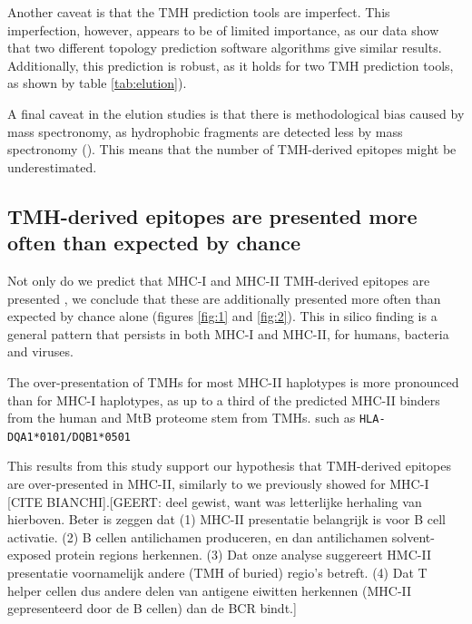 Another caveat is that the TMH prediction tools are imperfect.
This imperfection, however, appears to be of limited importance,
as our data show that two different topology prediction software algorithms give similar results.
Additionally, this 
prediction is robust, as it holds for two TMH prediction tools, 
as shown by table \ref{tab:elution}).

A final caveat in the elution studies is that there is methodological bias caused by mass spectronomy,
as hydrophobic fragments are detected less 
by mass spectronomy (\cite{bianchi2017}). This means that the number of TMH-derived epitopes
might be underestimated.

\subsection{TMH-derived epitopes are presented more often than expected by chance}


Not only do we predict that MHC-I and MHC-II TMH-derived epitopes 
are presented , we conclude that these are additionally
presented more often than expected by chance 
alone (figures \ref{fig:1} and \ref{fig:2}).
This in silico finding is a general pattern 
that persists in both MHC-I and MHC-II, 
for humans, bacteria and viruses. 

The over-presentation of TMHs for most MHC-II haplotypes 
is more pronounced than for MHC-I haplotypes,
as up to a third of the predicted MHC-II binders 
from the human and MtB proteome stem from TMHs.  
such as \verb;HLA-DQA1*0101/DQB1*0501; 

This results from this study support our hypothesis that TMH-derived epitopes are over-presented
in MHC-II, similarly to we previously showed for MHC-I [CITE BIANCHI].[GEERT: deel gewist, want was letterlijke herhaling van hierboven. Beter is zeggen dat (1) MHC-II presentatie belangrijk is voor B cell activatie. (2) B cellen antilichamen produceren, en dan antilichamen solvent-exposed protein regions herkennen. (3) Dat onze analyse suggereert HMC-II presentatie voornamelijk andere (TMH of buried) regio's betreft. (4) Dat T helper cellen dus andere delen van antigene eiwitten herkennen (MHC-II gepresenteerd door de B cellen) dan de BCR bindt.]

